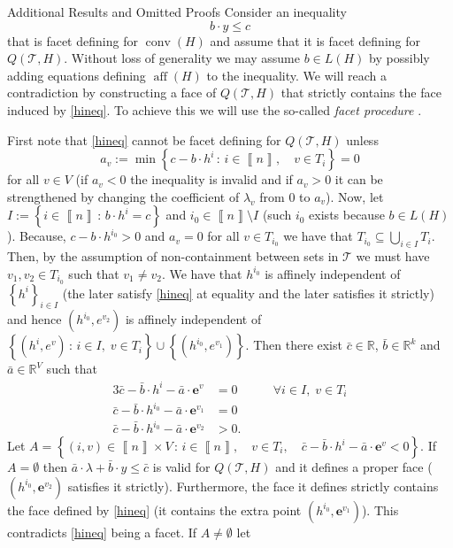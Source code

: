 \documentclass[mnsc]{informs3}
\newcommand{\set}[1]{\left\{#1\right\}}                     %
\newcommand{\bra}[1]{\left(#1\right)}
\newcommand{\sidx}[1]{\left\llbracket     #1 \right\rrbracket}
\newcommand{\Real}{\mathbb R}
\newcommand{\e}{\mathbf{e}}
\DeclareMathOperator{\conv}{conv}
\DeclareMathOperator{\aff}{aff}
\begin{document}
\begin{APPENDIX}{Additional Results and Omitted Proofs}
\HfacetpropProp*
{}
Consider an inequality 
\begin{equation}\label{hineq}
b\cdot y\leq c
\end{equation}
 that is facet defining for $\conv\bra{H}$ and assume that it is facet defining for $Q\bra{\mathcal{T},H}$. Without loss of generality we may assume $b\in L(H)$ by possibly adding equations defining  $\aff\bra{H}$ to the inequality.   We will reach a contradiction by constructing a face of $Q\bra{\mathcal{T},H}$ that strictly contains the face
induced by \eqref{hineq}. To achieve this we will use the so-called \emph{facet procedure} \citep{applegate2001tsp,chvatal2013local,Espinoza2010559}.

First note that \eqref{hineq} cannot be facet defining for $Q\bra{\mathcal{T},H}$ unless \[a_v:=\min\set{ c- b\cdot h^i\,:\, i\in \sidx{n},\quad v\in T_i}=0\] for all $v\in V$ (if $a_v<0$ the inequality is invalid and if $a_v>0$ it can be strengthened by changing the coefficient of $\lambda_v$ from $0$ to $a_v$).
Now, let $I:=\set{i\in \sidx{n}\,:\, b\cdot h^i = c }$ and $i_0\in \sidx{n}\setminus I$ (such $i_0$ exists because $b\in L(H)$). Because, $c- b\cdot h^{i_0}>0$ and $a_v=0$ for all $v\in T_{i_0}$ we have that $T_{i_0}\subseteq \bigcup_{i\in I} T_i$. Then, by the assumption of non-containment between sets in $\mathcal{T}$ we must have $v_1,v_2\in T_{i_0}$ such that $v_1\neq v_2$. We have that $h^{i_0}$ is affinely independent of $\set{h^i}_{i\in I}$ (the later satisfy \eqref{hineq} at equality and the later satisfies it strictly) and hence $\bra{h^{i_0},e^{v_2}}$ is affinely independent of $\set{\bra{h^{i},e^{v}}\,:\,{i\in I,\;v\in T_i}}\cup \set{\bra{h^{i_0},e^{v_1}}}$. Then there exist $\bar{c}\in \Real$, $\bar{b}\in \Real^k$ and $\bar{a}\in \Real^V$ such that 
\begin{alignat}{3}
\bar{c}- \bar{b}\cdot h^i -\bar{a} \cdot \e^v&=0&\quad&\forall i\in I,\;v\in T_i\\
\bar{c}- \bar{b}\cdot h^{i_0} -\bar{a} \cdot\e^{v_1}&=0\\
\bar{c}- \bar{b}\cdot h^{i_0} -\bar{a} \cdot\e^{v_2}&>0.
\end{alignat}
Let $A=\set{\bra{i,v}\in \sidx{n}\times V\,:\, i\in \sidx{n},\quad v\in T_i,\quad \bar{c}- \bar{b}\cdot h^{i} -\bar{a} \cdot\e^{v}<0}$. If $A=\emptyset$ then $\bar{a} \cdot\lambda+ \bar{b}\cdot y  \leq\bar{c}$ is valid for  $Q\bra{\mathcal{T},H}$ and it defines a proper face ($\bra{h^{i_0},\e^{v_2}}$ satisfies it strictly). Furthermore, the face it defines strictly contains the face defined by \eqref{hineq} (it contains the extra point $\bra{h^{i_0},\e^{v_1}}$). This contradicts \eqref{hineq} being a facet. If $A\neq \emptyset $ let 

\end{APPENDIX}
\end{document}
